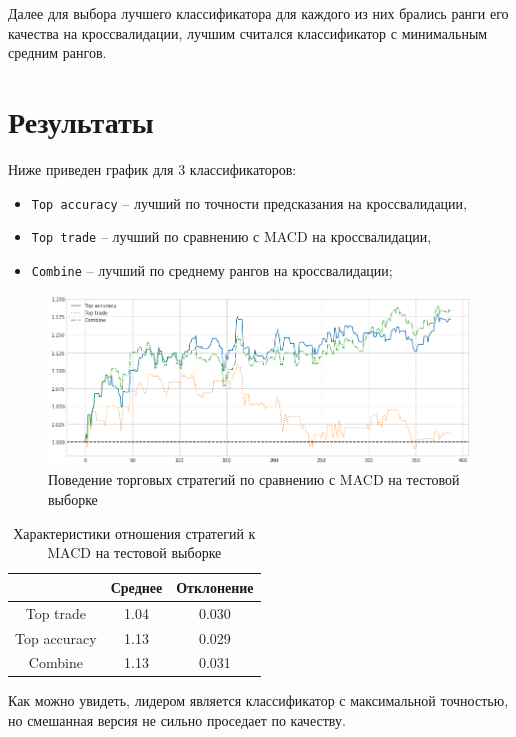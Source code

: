 \documentclass[pdftex,ptm,14pt,a4paper]{report}
\begin{document}
Далее для выбора лучшего классификатора для каждого из них брались ранги его качества на кроссвалидации, лучшим
считался классификатор с минимальным средним рангов.

\section{Результаты}

Ниже приведен график для 3 классификаторов:

\begin{itemize}
\item \texttt{Top accuracy} -- лучший по точности предсказания на кроссвалидации,
\item \texttt{Top trade} -- лучший по сравнению с MACD на кроссвалидации,
\item \texttt{Combine} -- лучший по среднему рангов на кроссвалидации;
\end{itemize}

\begin{figure}[h]
\includegraphics[width=\linewidth]{vs_macd_on_test}
\caption{Поведение торговых стратегий по сравнению с MACD на тестовой выборке}
\end{figure}

\begin{table}[h]
\centering
\begin{tabular}{| c | c | c |}
\hline
 & Среднее & Отклонение \\ \hline
Top trade & 1.04 & 0.030 \\ \hline
Top accuracy & 1.13 & 0.029 \\ \hline
Combine & 1.13 & 0.031 \\ \hline
\end{tabular}
\caption{Характеристики отношения стратегий к MACD на тестовой выборке}
\end{table}

Как можно увидеть, лидером является классификатор с максимальной точностью, но смешанная версия не сильно проседает по качеству.
\end{document}
